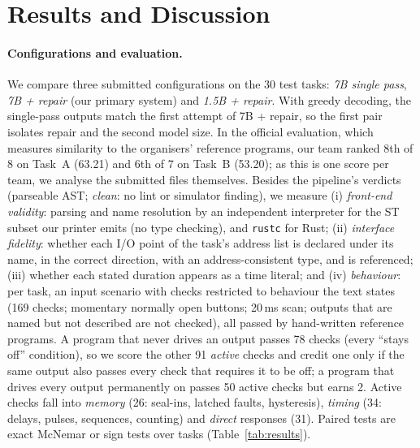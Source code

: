 \documentclass{ceurart}
\begin{document}
\section{Results and Discussion}
\label{sec:results}

\paragraph{Configurations and evaluation.}
We compare three submitted configurations on the 30 test tasks: \emph{7B single pass}, \emph{7B + repair} (our primary system) and \emph{1.5B + repair}. With greedy decoding, the single-pass outputs match the first attempt of 7B + repair, so the first pair isolates repair and the second model size. In the official evaluation, which measures similarity to the organisers' reference programs, our team ranked 8th of 8 on Task~A (63.21) and 6th of 7 on Task~B (53.20); as this is one score per team, we analyse the submitted files themselves. Besides the pipeline's verdicts (parseable AST; \emph{clean}: no lint or simulator finding), we measure (i) \emph{front-end validity}: parsing and name resolution by an independent interpreter for the ST subset our printer emits (no type checking), and \texttt{rustc} for Rust; (ii) \emph{interface fidelity}: whether each I/O point of the task's address list is declared under its name, in the correct direction, with an address-consistent type, and is referenced; (iii) whether each stated duration appears as a time literal; and (iv) \emph{behaviour}: per task, an input scenario with checks restricted to behaviour the text states (169 checks; momentary normally open buttons; 20\,ms scan; outputs that are named but not described are not checked), all passed by hand-written reference programs. A program that never drives an output passes 78 checks (every ``stays off'' condition), so we score the other 91 \emph{active} checks and credit one only if the same output also passes every check that requires it to be off; a program that drives every output permanently on passes 50 active checks but earns 2. Active checks fall into \emph{memory} (26: seal-ins, latched faults, hysteresis), \emph{timing} (34: delays, pulses, sequences, counting) and \emph{direct} responses (31). Paired tests are exact McNemar or sign tests over tasks (Table~\ref{tab:results}).
\end{document}
